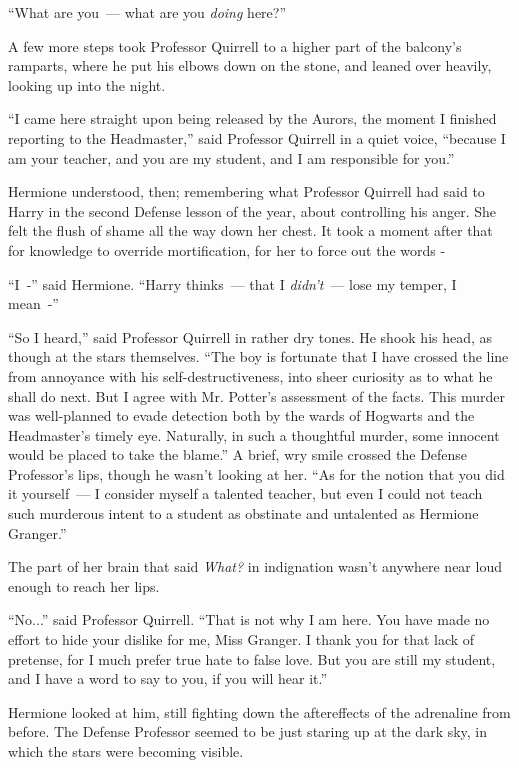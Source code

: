 ``What are you~--- what are you \emph{doing} here?''

A few more steps took Professor Quirrell to a higher part of the balcony's ramparts, where he put his elbows down on the stone, and leaned over heavily, looking up into the night.

``I came here straight upon being released by the Aurors, the moment I finished reporting to the Headmaster,'' said Professor Quirrell in a quiet voice, ``because I am your teacher, and you are my student, and I am responsible for you.''

Hermione understood, then; remembering what Professor Quirrell had said to Harry in the second Defense lesson of the year, about controlling his anger. She felt the flush of shame all the way down her chest. It took a moment after that for knowledge to override mortification, for her to force out the words -

``I~-'' said Hermione. ``Harry thinks~--- that I \emph{didn't}~--- lose my temper, I mean~-''

``So I heard,'' said Professor Quirrell in rather dry tones. He shook his head, as though at the stars themselves. ``The boy is fortunate that I have crossed the line from annoyance with his self-destructiveness, into sheer curiosity as to what he shall do next. But I agree with Mr. Potter's assessment of the facts. This murder was well-planned to evade detection both by the wards of Hogwarts and the Headmaster's timely eye. Naturally, in such a thoughtful murder, some innocent would be placed to take the blame.'' A brief, wry smile crossed the Defense Professor's lips, though he wasn't looking at her. ``As for the notion that you did it yourself~--- I consider myself a talented teacher, but even I could not teach such murderous intent to a student as obstinate and untalented as Hermione Granger.''

The part of her brain that said \emph{What?} in indignation wasn't anywhere near loud enough to reach her lips.

``No...'' said Professor Quirrell. ``That is not why I am here. You have made no effort to hide your dislike for me, Miss Granger. I thank you for that lack of pretense, for I much prefer true hate to false love. But you are still my student, and I have a word to say to you, if you will hear it.''

Hermione looked at him, still fighting down the aftereffects of the adrenaline from before. The Defense Professor seemed to be just staring up at the dark sky, in which the stars were becoming visible.

